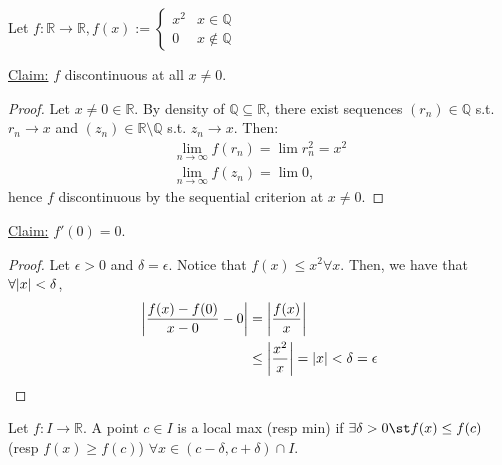 \begin{example}
    Let $f: \mathbb{R} \to \mathbb{R}, f(x) := \begin{cases}
        x^2 & x \in \mathbb{Q}\\
        0 & x \notin \mathbb{Q}
    \end{cases}$

    \noindent\underline{Claim:} $f$ discontinuous at all $x \neq 0$.

    \begin{proof}
        Let $x \neq 0 \in \mathbb{R}$. By density of $\mathbb{Q} \subseteq \mathbb{R}$, there exist sequences $(r_n) \in \mathbb{Q}$ s.t. $r_n \to x$ and $(z_n) \in \mathbb{R} \setminus \mathbb{Q}$ s.t. $z_n \to x$. Then:\begin{align*}
            \lim_{n \to \infty} f(r_n) = \lim r_n^2 = x^2\\
            \lim_{n \to \infty} f(z_n) = \lim 0,
        \end{align*}
        hence $f$ discontinuous by the sequential criterion at $x \neq 0$.
    \end{proof}
    
    \noindent\underline{Claim:} $f'(0) = 0$. 
    \begin{proof}
        Let $\epsilon > 0$ and $\delta = \epsilon$. Notice that $f(x) \leq x^2 \forall x$. Then, we have that $\forall \abs{x} < \delta$, \begin{align*}
            \abs{\frac{f(x) - f(0)}{x-0} - 0} &= \abs{\frac{f(x)}{x}} \\
            &\leq \abs{\frac{x^2}{x}} = \abs{x} < \delta = \epsilon 
        \end{align*}
    \end{proof}
\end{example}

\begin{definition}
    Let $f: I \to \mathbb{R}$. A point $c \in I$ is a local max (resp min) if $\exists \delta > 0 \st f(x) \leq f(c)$ (resp $f(x) \geq f(c)$) $\forall x \in (c - \delta, c + \delta) \cap I$.
\end{definition}

